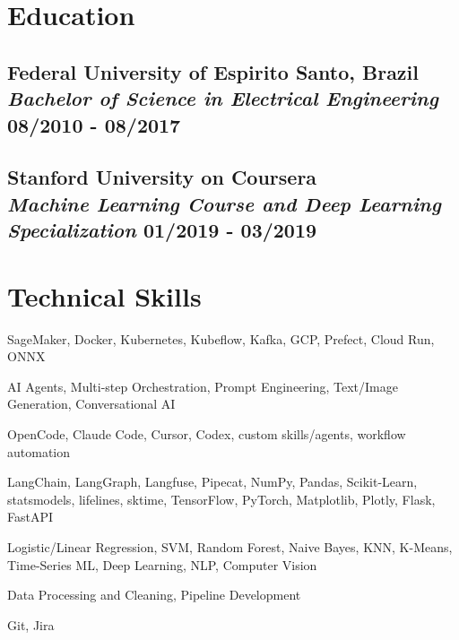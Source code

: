 \documentclass[11pt]{article} %
\begin{document}
\section{Education}
\subsection{Federal University of Espirito Santo, Brazil \\ {\normalfont\itshape Bachelor of Science in Electrical Engineering} \hfill 08/2010 - 08/2017}

\vspace{0.3cm} %

\subsection{Stanford University on Coursera \\ {\normalfont\itshape Machine Learning Course and Deep Learning Specialization} \hfill 01/2019 - 03/2019}

\vspace{0.3cm} %

\section{Technical Skills}
\begin{description}[itemsep=0pt]
	\item[MLOps:] SageMaker, Docker, Kubernetes, Kubeflow, Kafka, GCP, Prefect, Cloud Run, ONNX
	\item[AI/LLM:] AI Agents, Multi-step Orchestration, Prompt Engineering, Text/Image Generation, Conversational AI
	\item[AI Coding Assistants:] OpenCode, Claude Code, Cursor, Codex, custom skills/agents, workflow automation
	\item[Python:] LangChain, LangGraph, Langfuse, Pipecat, NumPy, Pandas, Scikit-Learn,\\ statsmodels, lifelines, sktime, TensorFlow, PyTorch, Matplotlib, Plotly, Flask, FastAPI
	\item[Machine Learning:] Logistic/Linear Regression, SVM, Random Forest, Naive Bayes, KNN, K-Means, Time-Series ML, Deep Learning, NLP, Computer Vision
	\item[Data Engineering:] Data Processing and Cleaning, Pipeline Development
	\item[Tools:] Git, Jira
\end{description}
\end{document}
